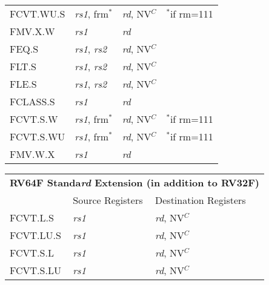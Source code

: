 \begin{tabular}{p{25mm}|p{3cm}|p{6cm}|p{10cm}}
   \cline{2-3}
   FCVT.WU.S & {\em rs1}, frm$^*$ & {\em rd}, NV$^C$ & $^*$if rm=111 \\
   \cline{2-3}
   FMV.X.W & {\em rs1} & {\em rd} &  \\
   \cline{2-3}
   FEQ.S & {\em rs1}, {\em rs2} & {\em rd}, NV$^C$ &  \\
   \cline{2-3}
   FLT.S & {\em rs1}, {\em rs2} & {\em rd}, NV$^C$ &  \\
   \cline{2-3}
   FLE.S & {\em rs1}, {\em rs2} & {\em rd}, NV$^C$ &  \\
   \cline{2-3}
   FCLASS.S & {\em rs1} & {\em rd} &  \\
   \cline{2-3}
   FCVT.S.W & {\em rs1}, frm$^*$ & {\em rd}, NV$^C$ & $^*$if rm=111 \\
   \cline{2-3}
   FCVT.S.WU & {\em rs1}, frm$^*$ & {\em rd}, NV$^C$ & $^*$if rm=111 \\
   \cline{2-3}
   FMV.W.X & {\em rs1} & {\em rd} &  \\
   \cline{2-3}
\end{tabular}

\begin{tabular}{p{25mm}|p{3cm}|p{6cm}|p{10cm}}
  \multicolumn{4}{l}{\bf RV64F Standa{\em rd} Extension (in addition to RV32F)} \\
  \cline{2-3}
   & Source Registers & Destination Registers \\
  \cline{2-3}
   FCVT.L.S & {\em rs1} & {\em rd}, NV$^C$ &  \\
   \cline{2-3}
   FCVT.LU.S & {\em rs1} & {\em rd}, NV$^C$ &  \\
   \cline{2-3}
   FCVT.S.L & {\em rs1} & {\em rd}, NV$^C$ &  \\
   \cline{2-3}
   FCVT.S.LU & {\em rs1} & {\em rd}, NV$^C$ &  \\
   \cline{2-3}
\end{tabular}

